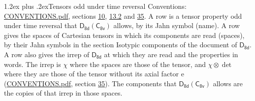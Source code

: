 \documentclass[10pt,a4paper]{article}
\makeatletter
\renewcommand\section{\@startsection{section}{1}{\z@}{-3ex plus -1ex minus -.2ex}%
  {1.2ex plus .2ex}{\normalfont\large\sffamily\bfseries\color{parttitle}}}
\numberwithin{equation}{section}
\newcommand{\grp}[1]{\mathsf{#1}}
\newcommand{\irrprod}{\otimes}
\makeatother
\begin{document}
\section{Tensors odd under time reversal}\label{s:time_odd}
Conventions: \href{../../CONVENTIONS.pdf}{CONVENTIONS.pdf}, sections \href{../../../rotation/CONVENTIONS.pdf\#conv.10}{10}, \href{../../../rotation/CONVENTIONS.pdf\#conv.13.2}{13.2} and \href{../../CONVENTIONS.pdf\#conv.35}{35}.
\leavevmode\label{n:head.name.property}A row is a tensor property odd under time reversal that $\grp{D_{8d}}(\grp{C_{8v}})$ allows, by its Jahn symbol (name). \label{n:head.spaces}A row gives the spaces of Cartesian tensors in which its components are read (spaces), by their Jahn symbols in the section Isotypic components of the document of \href{../../../rotation/data/pdf/D8d.pdf}{$\grp{D_{8d}}$}. \label{n:head.properties}A row also gives the irrep of $\grp{D_{8d}}$ at which they are read and the properties in words. The irrep is $\chi$ where the spaces are those of the tensor, and $\chi \irrprod \det$ where they are those of the tensor without its axial factor e (\href{../../CONVENTIONS.pdf}{CONVENTIONS.pdf}, section \href{../../CONVENTIONS.pdf\#conv.35}{35}). The components that $\grp{D_{8d}}(\grp{C_{8v}})$ allows are the copies of that irrep in those spaces.
\end{document}
